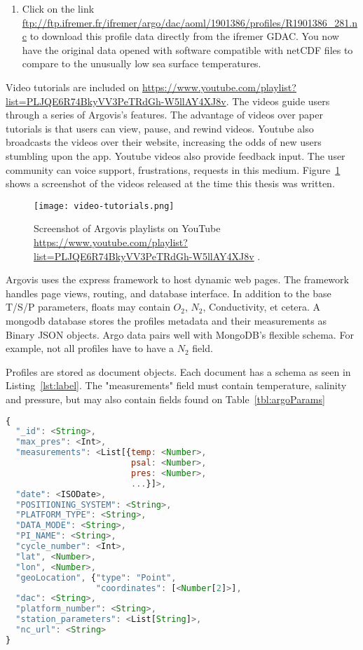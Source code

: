 \begin{enumerate}
\item Click on the link \url{ftp://ftp.ifremer.fr/ifremer/argo/dac/aoml/1901386/profiles/R1901386_281.nc} to download this profile data directly from the ifremer GDAC. You now have the original data opened with software compatible with netCDF files to compare to the unusually low sea surface temperatures. 

\end{enumerate}



Video tutorials are included on \url{https://www.youtube.com/playlist?list=PLJQE6R74BkyVV3PeTRdGh-W5llAY4XJ8v}. The videos guide users through a series of Argovis's features. The advantage of videos over paper tutorials is that users can view, pause, and rewind videos. Youtube also broadcasts the videos over their website, increasing the odds of new users stumbling upon the app. Youtube videos also provide feedback input. The user community can voice support, frustrations, requests in this medium.  Figure~\ref{fig:yt-vids} shows a screenshot of the videos released at the time this thesis was written.

\begin{figure}[H]
\begin{minipage}{6in}
\centering
\texttt{[image: video-tutorials.png]}
\caption{\label{fig:yt-vids} Screenshot of Argovis playlists on YouTube \url{https://www.youtube.com/playlist?list=PLJQE6R74BkyVV3PeTRdGh-W5llAY4XJ8v} . }
\end{minipage}
\end{figure}


Argovis uses the \gls{express} framework to host dynamic web pages. The framework handles page views, routing, and database interface. In addition to the base T/S/P parameters, floats may contain $O_2$, $N_2$, Conductivity, et cetera. A \gls{mongodb} database stores the profiles metadata and their measurements as Binary JSON objects. Argo data pairs well with MongoDB's flexible schema. For example, not all profiles have to have a $N_2$ field.


Profiles are stored as document objects. Each document has a schema as seen in Listing~\ref{lst:label}. The "measurements" field must contain temperature, salinity and pressure, but may also contain fields found on Table~\ref{tbl:argoParams}
\begin{lstlisting}[language=JavaScript, label={lst:label}, caption=JSON schema of mongoDB profile.]
{
  "_id": <String>,
  "max_pres": <Int>,
  "measurements": <List[{temp: <Number>,
                         psal: <Number>,
                         pres: <Number>,
                         ...}]>,
  "date": <ISODate>,
  "POSITIONING_SYSTEM": <String>,
  "PLATFORM_TYPE": <String>,
  "DATA_MODE": <String>,
  "PI_NAME": <String>,
  "cycle_number": <Int>,
  "lat", <Number>,
  "lon", <Number>,
  "geoLocation", {"type": "Point",
                  "coordinates": [<Number[2]>],
  "dac": <String>,
  "platform_number": <String>,
  "station_parameters": <List[String]>, 
  "nc_url": <String>
}
\end{lstlisting}

